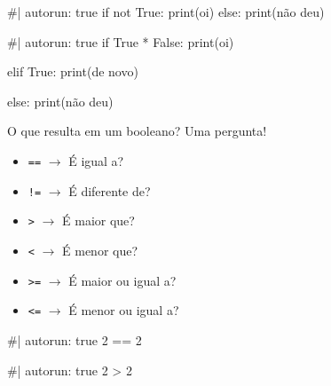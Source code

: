 \documentclass[
  letterpaper,
  DIV=11,
  numbers=noendperiod]{scrreprt}
\newenvironment{Shaded}{\begin{snugshade}}{\end{snugshade}}
\newcommand{\NormalTok}[1]{\textcolor[rgb]{0.00,0.23,0.31}{#1}}
\providecommand{\tightlist}{%
  \setlength{\itemsep}{0pt}\setlength{\parskip}{0pt}}
\begin{document}
\begin{Shaded}
\begin{Highlighting}[]
\NormalTok{\#| autorun: true}
\NormalTok{if not True:}
\NormalTok{    print(\textquotesingle{}oi\textquotesingle{})}
\NormalTok{else:}
\NormalTok{    print(\textquotesingle{}não deu\textquotesingle{})}
\end{Highlighting}
\end{Shaded}

\begin{Shaded}
\begin{Highlighting}[]
\NormalTok{\#| autorun: true}
\NormalTok{if  True * False:}
\NormalTok{    print(\textquotesingle{}oi\textquotesingle{})}

\NormalTok{elif True:}
\NormalTok{    print(\textquotesingle{}de novo\textquotesingle{})}

\NormalTok{else:}
\NormalTok{    print(\textquotesingle{}não deu\textquotesingle{})}
\end{Highlighting}
\end{Shaded}

O que resulta em um booleano? Uma pergunta!

\begin{itemize}
\tightlist
\item
  \texttt{==} \(\rightarrow\) É igual a?
\item
  \texttt{!=} \(\rightarrow\) É diferente de?
\item
  \texttt{\textgreater{}} \(\rightarrow\) É maior que?
\item
  \texttt{\textless{}} \(\rightarrow\) É menor que?
\item
  \texttt{\textgreater{}=} \(\rightarrow\) É maior ou igual a?
\item
  \texttt{\textless{}=} \(\rightarrow\) É menor ou igual a?
\end{itemize}

\begin{Shaded}
\begin{Highlighting}[]
\NormalTok{\#| autorun: true}
\NormalTok{2 == 2}
\end{Highlighting}
\end{Shaded}

\begin{Shaded}
\begin{Highlighting}[]
\NormalTok{\#| autorun: true}
\NormalTok{2 \textgreater{} 2}
\end{Highlighting}
\end{Shaded}
\end{document}
